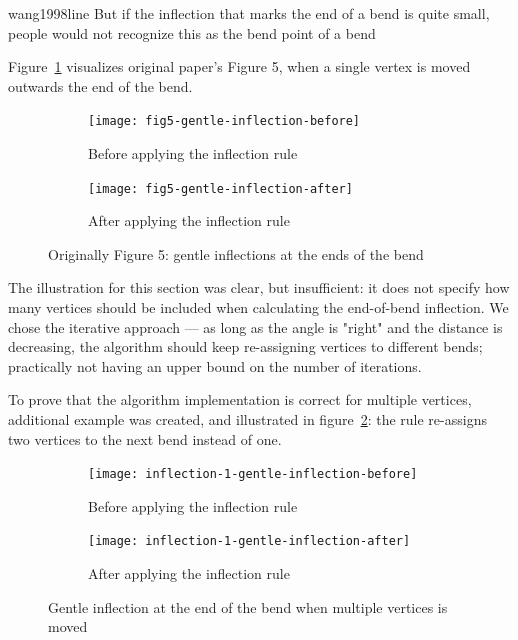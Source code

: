 \documentclass[a4paper]{article}
\begin{document}
\begin{displaycquote}{wang1998line}
    But if the inflection that marks the end of a bend is quite small, people
    would not recognize this as the bend point of a bend
\end{displaycquote}

Figure~\ref{fig:fig5-gentle-inflection} visualizes original paper's Figure 5,
when a single vertex is moved outwards the end of the bend.

\begin{figure}[h]
    \centering
    \begin{subfigure}[b]{.49\textwidth}
        \texttt{[image: fig5-gentle-inflection-before]}
        \caption{Before applying the inflection rule}
    \end{subfigure}
    \hfill
    \begin{subfigure}[b]{.49\textwidth}
        \texttt{[image: fig5-gentle-inflection-after]}
        \caption{After applying the inflection rule}
    \end{subfigure}
    \caption{Originally Figure 5: gentle inflections at the ends of the bend}
    \label{fig:fig5-gentle-inflection}
\end{figure}

The illustration for this section was clear, but insufficient: it does not
specify how many vertices should be included when calculating the end-of-bend
inflection. We chose the iterative approach --- as long as the angle is "right"
and the distance is decreasing, the algorithm should keep re-assigning vertices
to different bends; practically not having an upper bound on the number of
iterations.

To prove that the algorithm implementation is correct for multiple vertices,
additional example was created, and illustrated in
figure~\ref{fig:inflection-1-gentle-inflection}: the rule re-assigns two
vertices to the next bend instead of one.

\begin{figure}[h]
    \centering
    \begin{subfigure}[b]{.45\textwidth}
        \texttt{[image: inflection-1-gentle-inflection-before]}
        \caption{Before applying the inflection rule}
    \end{subfigure}
    \hfill
    \begin{subfigure}[b]{.45\textwidth}
        \texttt{[image: inflection-1-gentle-inflection-after]}
        \caption{After applying the inflection rule}
    \end{subfigure}
    \caption{Gentle inflection at the end of the bend when multiple vertices is moved}
    \label{fig:inflection-1-gentle-inflection}
\end{figure}
\end{document}
